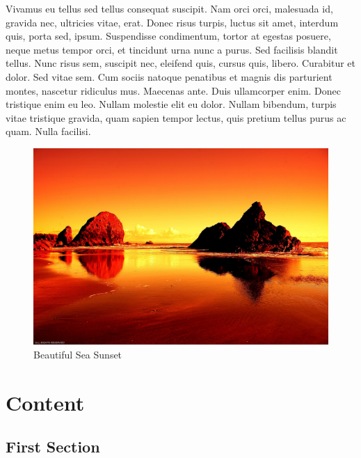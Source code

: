 \documentclass{yMemoir}
\begin{document}
	\lipsum[3]
	
	
	Vivamus eu tellus sed tellus consequat suscipit. Nam orci orci, malesuada
	id, gravida nec, ultricies vitae, erat. Donec risus turpis, luctus sit amet, interdum quis, porta sed, ipsum. Suspendisse condimentum, tortor at egestas
	posuere, neque metus tempor orci, et tincidunt urna nunc a purus. Sed
	facilisis blandit tellus. Nunc risus sem, suscipit nec, eleifend quis, cursus
	quis, libero. Curabitur et dolor. Sed vitae sem\sidenote{\lipsum[27]}. Cum sociis natoque penatibus et magnis dis parturient montes, nascetur ridiculus mus. Maecenas
	ante. Duis ullamcorper enim. Donec tristique enim eu leo. Nullam molestie
	elit eu dolor. Nullam bibendum, turpis vitae tristique gravida, quam sapien
	tempor lectus, quis pretium tellus purus ac quam. Nulla facilisi.
	
	\lipsum[26]
	
	\begin{figure}
		\includegraphics[width=\linewidth]{images/sunset.jpg}
		\caption{Beautiful Sea Sunset}
	\end{figure}
	
	
	
	\chapter{Content}
	\lipsum[2]
	\lipsum[3]
	
	\section{First Section}
\end{document}
